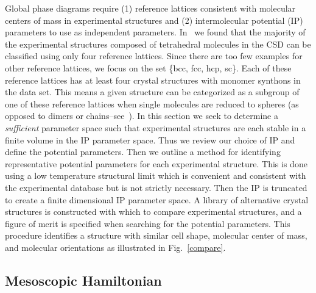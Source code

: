\documentclass[preprint]{iucr}              %
\begin{document}
Global phase diagrams require (1) reference lattices consistent with
molecular centers of mass in experimental structures and (2)
intermolecular potential (IP) parameters to use as independent
parameters. In~\cite{McClurg09} we found that the majority of the
experimental structures composed of tetrahedral molecules in the CSD can be
classified using only four reference lattices. Since there are too few examples
for other reference lattices, we focus on the set \{bcc, fcc,
hcp, sc\}. Each of these reference lattices has at least four crystal
structures with monomer synthons in the data set.  This means a given structure
can be categorized as a subgroup of one of these reference lattices when single
molecules are reduced to spheres (as opposed to dimers or chains--see~\cite{McClurg09}).  In this section we seek to determine a \emph{sufficient}
parameter space such that experimental
structures are each stable in a finite volume in the IP parameter space. Thus we
review
our choice of IP and define the potential parameters.  Then we
outline a method for identifying representative potential parameters
for each experimental structure. This is done using a low
temperature structural limit which is convenient and consistent with the
experimental database but is not strictly necessary.  Then
the IP is truncated to create a finite dimensional IP parameter
space.  A library of alternative crystal structures is constructed
with which to compare experimental structures, and a figure of merit
is specified when searching for the potential parameters. This
procedure identifies a structure with similar cell shape, molecular
center of mass, and molecular orientations as illustrated in
Fig.~\ref{compare}.

\subsection{Mesoscopic Hamiltonian}
\label{hamiltonian}
\end{document}
